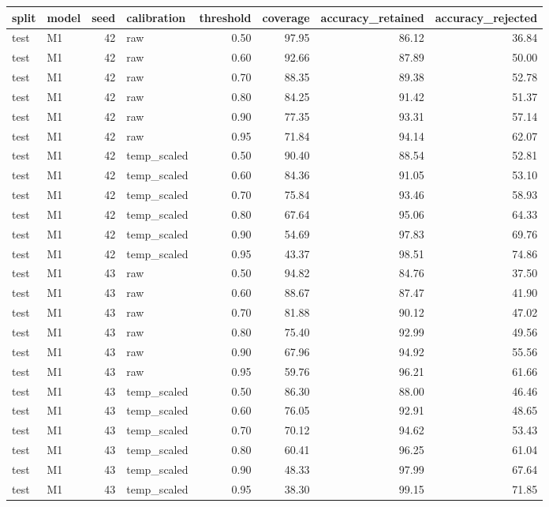 \begin{tabular}{llrlrrrr}
\toprule
split & model & seed & calibration & threshold & coverage & accuracy\_retained & accuracy\_rejected \\
\midrule
test & M1 & 42 & raw & 0.50 & 97.95 & 86.12 & 36.84 \\
test & M1 & 42 & raw & 0.60 & 92.66 & 87.89 & 50.00 \\
test & M1 & 42 & raw & 0.70 & 88.35 & 89.38 & 52.78 \\
test & M1 & 42 & raw & 0.80 & 84.25 & 91.42 & 51.37 \\
test & M1 & 42 & raw & 0.90 & 77.35 & 93.31 & 57.14 \\
test & M1 & 42 & raw & 0.95 & 71.84 & 94.14 & 62.07 \\
test & M1 & 42 & temp\_scaled & 0.50 & 90.40 & 88.54 & 52.81 \\
test & M1 & 42 & temp\_scaled & 0.60 & 84.36 & 91.05 & 53.10 \\
test & M1 & 42 & temp\_scaled & 0.70 & 75.84 & 93.46 & 58.93 \\
test & M1 & 42 & temp\_scaled & 0.80 & 67.64 & 95.06 & 64.33 \\
test & M1 & 42 & temp\_scaled & 0.90 & 54.69 & 97.83 & 69.76 \\
test & M1 & 42 & temp\_scaled & 0.95 & 43.37 & 98.51 & 74.86 \\
test & M1 & 43 & raw & 0.50 & 94.82 & 84.76 & 37.50 \\
test & M1 & 43 & raw & 0.60 & 88.67 & 87.47 & 41.90 \\
test & M1 & 43 & raw & 0.70 & 81.88 & 90.12 & 47.02 \\
test & M1 & 43 & raw & 0.80 & 75.40 & 92.99 & 49.56 \\
test & M1 & 43 & raw & 0.90 & 67.96 & 94.92 & 55.56 \\
test & M1 & 43 & raw & 0.95 & 59.76 & 96.21 & 61.66 \\
test & M1 & 43 & temp\_scaled & 0.50 & 86.30 & 88.00 & 46.46 \\
test & M1 & 43 & temp\_scaled & 0.60 & 76.05 & 92.91 & 48.65 \\
test & M1 & 43 & temp\_scaled & 0.70 & 70.12 & 94.62 & 53.43 \\
test & M1 & 43 & temp\_scaled & 0.80 & 60.41 & 96.25 & 61.04 \\
test & M1 & 43 & temp\_scaled & 0.90 & 48.33 & 97.99 & 67.64 \\
test & M1 & 43 & temp\_scaled & 0.95 & 38.30 & 99.15 & 71.85 \\

\end{tabular}
